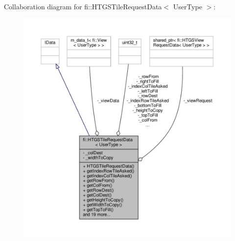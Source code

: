 Collaboration diagram for fi\+:\+:H\+T\+G\+S\+Tile\+Request\+Data$<$ User\+Type $>$\+:
\nopagebreak
\begin{figure}[H]
\begin{center}
\leavevmode
\includegraphics[width=350pt]{d8/d64/classfi_1_1HTGSTileRequestData__coll__graph}
\end{center}
\end{figure}
